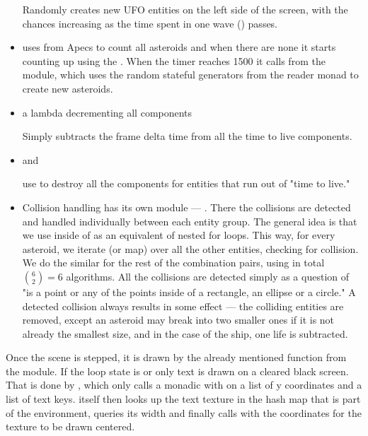 \documentclass[
  digital, %
  color,   %
  table,   %
  oneside, %
  lof,     %
  lot,     %
]{fithesis3}
\begin{document}
\begin{itemize}[-]
    Randomly creates new UFO entities on the left side of the screen,
    with the chances increasing as the time spent in one wave () passes.

    \item {}

    uses  from Apecs to count all asteroids and
    when there are none it starts counting up using the .
    When the timer reaches 1500 it calls 
    from the  module, which uses the random stateful
    generators from the  reader monad to create new asteroids.

    \item a lambda decrementing all  components

    Simply subtracts the frame delta time  from all the time to live components.

    \item {} and 

    use  to destroy all the components for entities that run out of "time to live."

    \item {}

    Collision handling has its own module — .
    There the collisions are detected and handled individually between each
    entity group. The general idea is that we use  inside of 
    as an equivalent of nested for loops. This way, for every asteroid,
    we iterate (or map) over all the other entities, checking for collision.
    We do the similar for the rest of the combination pairs,
    using in total $\binom{6}{2} = 6$ algorithms. All the collisions are detected
    simply as a question of "is a point or any of the points inside of a rectangle,
    an ellipse or a circle." A detected collision always results in some effect
    — the colliding entities are removed, except an asteroid may break into two
    smaller ones if it is not already the smallest size, and
    in the case of the ship, one life is subtracted.

\end{itemize}

Once the scene is stepped, it is drawn by the already mentioned 
function from the  module. If the loop state is  or
 only text is drawn on a cleared black screen. That is done by
, which only calls a monadic  with
 on a list of y coordinates and a list of text keys.
 itself then looks up the text texture in the
hash map that is part of the  environment,
queries its width and finally calls  with the coordinates
for the texture to be drawn centered.
\end{document}
